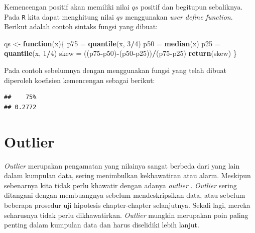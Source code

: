 \documentclass[]{book}
\newenvironment{Shaded}{\begin{snugshade}}{\end{snugshade}}
\newcommand{\KeywordTok}[1]{\textcolor[rgb]{0.13,0.29,0.53}{\textbf{#1}}}
\newcommand{\DecValTok}[1]{\textcolor[rgb]{0.00,0.00,0.81}{#1}}
\newcommand{\StringTok}[1]{\textcolor[rgb]{0.31,0.60,0.02}{#1}}
\newcommand{\ControlFlowTok}[1]{\textcolor[rgb]{0.13,0.29,0.53}{\textbf{#1}}}
\newcommand{\OperatorTok}[1]{\textcolor[rgb]{0.81,0.36,0.00}{\textbf{#1}}}
\newcommand{\NormalTok}[1]{#1}
\begin{document}
Kemencengan positif akan memiliki nilai \(qs\) positif dan begitupun
sebaliknya. Pada \texttt{R} kita dapat menghitung nilai \(qs\)
menggunakan \emph{user define function}. Berikut adalah contoh sintaks
fungsi yang dibuat:

\begin{Shaded}
\begin{Highlighting}[]
\NormalTok{qs <-}\StringTok{ }\ControlFlowTok{function}\NormalTok{(x)\{}
\NormalTok{  p75 =}\StringTok{ }\KeywordTok{quantile}\NormalTok{(x, }\DecValTok{3}\OperatorTok{/}\DecValTok{4}\NormalTok{)}
\NormalTok{  p50 =}\StringTok{ }\KeywordTok{median}\NormalTok{(x)}
\NormalTok{  p25 =}\StringTok{ }\KeywordTok{quantile}\NormalTok{(x, }\DecValTok{1}\OperatorTok{/}\DecValTok{4}\NormalTok{)}
\NormalTok{  skew =}\StringTok{ }\NormalTok{((p75}\OperatorTok{-}\NormalTok{p50)}\OperatorTok{-}\NormalTok{(p50}\OperatorTok{-}\NormalTok{p25))}\OperatorTok{/}\NormalTok{(p75}\OperatorTok{-}\NormalTok{p25)}
  \KeywordTok{return}\NormalTok{(skew)}
\NormalTok{\}}
\end{Highlighting}
\end{Shaded}

Pada contoh sebelumnya dengan menggunakan fungsi yang telah dibuat
diperoleh koefisien kemencengan sebagai berikut:

\begin{Shaded}
\end{Shaded}

\begin{verbatim}
##    75% 
## 0.2772
\end{verbatim}

\section{Outlier}\label{outlier}

\emph{Outlier} merupakan pengamatan yang nilainya sangat berbeda dari
yang lain dalam kumpulan data, sering menimbulkan kekhawatiran atau
alarm. Meskipun sebenarnya kita tidak perlu khawatir dengan adanya
\emph{outlier} . \emph{Outlier} sering ditangani dengan membuangnya
sebelum mendeskripsikan data, atau sebelum beberapa prosedur uji
hipotesis chapter-chapter selanjutnya. Sekali lagi, mereka seharusnya
tidak perlu dikhawatirkan. \emph{Outlier} mungkin merupakan poin paling
penting dalam kumpulan data dan harus diselidiki lebih lanjut.
\end{document}

